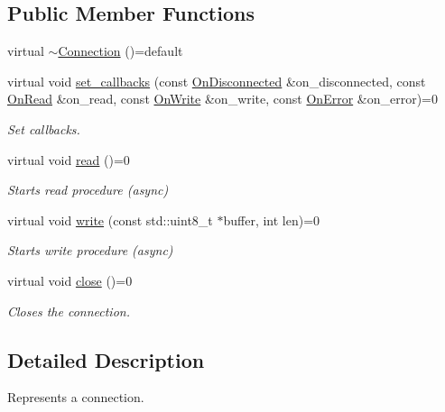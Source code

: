 \subsection*{Public Member Functions}
\begin{DoxyCompactItemize}
\item 
virtual \hyperlink{classTcpBackend_1_1Connection_af9b388c0d9a4af734257da80bde24e30}{$\sim$\+Connection} ()=default
\item 
virtual void \hyperlink{classTcpBackend_1_1Connection_a653318aa6306df78e53af47ae9d05e04}{set\+\_\+callbacks} (const \hyperlink{namespaceTcpBackend_a2ce9b1a1f46bfa6c4b1ad38c8aa262a6}{On\+Disconnected} \&on\+\_\+disconnected, const \hyperlink{namespaceTcpBackend_a7d2c9f63e8017af705255d4ed08264a7}{On\+Read} \&on\+\_\+read, const \hyperlink{namespaceTcpBackend_a670c71abc926680e1ea574a5f3a99135}{On\+Write} \&on\+\_\+write, const \hyperlink{namespaceTcpBackend_a17e8f044749312a6692cd0135565cbc4}{On\+Error} \&on\+\_\+error)=0
\begin{DoxyCompactList}\small\item\em Set callbacks. \end{DoxyCompactList}\item 
virtual void \hyperlink{classTcpBackend_1_1Connection_a53c7544a1dc738fbf69d8081742f319c}{read} ()=0
\begin{DoxyCompactList}\small\item\em Starts read procedure (async) \end{DoxyCompactList}\item 
virtual void \hyperlink{classTcpBackend_1_1Connection_ab63e884129259b72a1d4614237048c46}{write} (const std\+::uint8\+\_\+t $\ast$buffer, int len)=0
\begin{DoxyCompactList}\small\item\em Starts write procedure (async) \end{DoxyCompactList}\item 
virtual void \hyperlink{classTcpBackend_1_1Connection_aa3cbc715deb54c286149457c7819f514}{close} ()=0
\begin{DoxyCompactList}\small\item\em Closes the connection. \end{DoxyCompactList}\end{DoxyCompactItemize}


\subsection{Detailed Description}
Represents a connection. 

